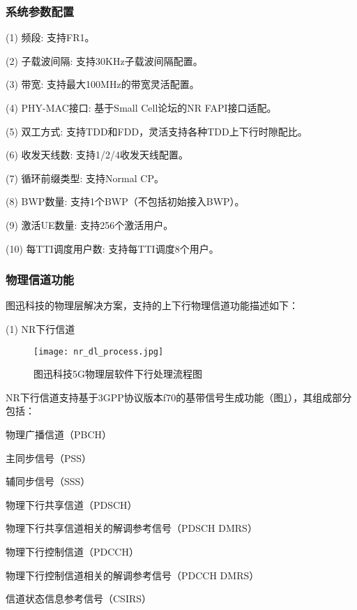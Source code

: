 \subsubsection{系统参数配置}

(1) 频段: 支持FR1。

(2) 子载波间隔: 支持30KHz子载波间隔配置。

(3) 带宽: 支持最大100MHz的带宽灵活配置。

(4) PHY-MAC接口: 基于Small Cell论坛的NR FAPI接口适配。

(5) 双工方式: 支持TDD和FDD，灵活支持各种TDD上下行时隙配比。

(6) 收发天线数: 支持1/2/4收发天线配置。

(7) 循环前缀类型: 支持Normal CP。

(8) BWP数量: 支持1个BWP（不包括初始接入BWP）。

(9) 激活UE数量: 支持256个激活用户。

(10) 每TTI调度用户数: 支持每TTI调度8个用户。

\subsubsection{物理信道功能}
图迅科技的物理层解决方案，支持的上下行物理信道功能描述如下：

(1) NR下行信道 

\begin{figure}[!htbp]
  \centering
  \texttt{[image: nr\_dl\_process.jpg]}
  \caption{图迅科技5G物理层软件下行处理流程图}
  \label{F.1_2}
\end{figure}

\par
{} %
\setlength{\hangindent}{2em}
NR下行信道支持基于3GPP协议版本f70的基带信号生成功能（图\ref{F.1_2}），其组成部分包括：
\par
{} %
\setlength{\hangindent}{2em}
物理广播信道（PBCH）
\par
{} %
\setlength{\hangindent}{2em}
主同步信号（PSS）
\par
{} %
\setlength{\hangindent}{2em}
辅同步信号（SSS）
\par
{} %
\setlength{\hangindent}{2em}
物理下行共享信道（PDSCH）
\par
{} %
\setlength{\hangindent}{2em}
物理下行共享信道相关的解调参考信号（PDSCH DMRS）
\par
{} %
\setlength{\hangindent}{2em}
物理下行控制信道（PDCCH）
\par
{} %
\setlength{\hangindent}{2em}
物理下行控制信道相关的解调参考信号（PDCCH DMRS）
\par
{} %
\setlength{\hangindent}{2em}
信道状态信息参考信号（CSIRS）\\

